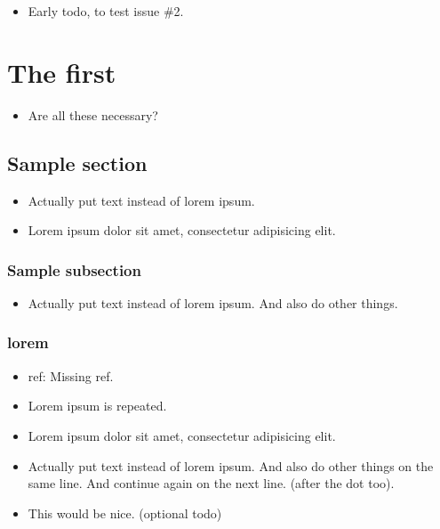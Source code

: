     \begin{itemize}[noitemsep]
        \item {\color{red}Early todo, to test issue \#2.}
    \end{itemize}
\chapter{The first}
\label{autosec:0}
    \begin{itemize}[noitemsep]
        \item {\color{ForestGreen}Are all these necessary?}
    \end{itemize}
\section{Sample section}
\label{autosec:1}
    \begin{itemize}[noitemsep]
        \item {\color{red}Actually put text instead of lorem ipsum.}
        \item Lorem ipsum dolor sit amet, consectetur adipisicing elit.
    \end{itemize}
\subsection{Sample subsection}
\label{autosec:2}
    \begin{itemize}[noitemsep]
        \item {\color{red}Actually put text instead of lorem ipsum.}
{\color{red}And also do other things.}
    \end{itemize}
\subsection{lorem}
\label{autosec:3}
    \begin{itemize}[noitemsep]
        \item {\color{Periwinkle}ref: Missing ref.}
        \item {\color{DarkOrchid}Lorem ipsum is repeated.}
        \item Lorem ipsum dolor sit amet, consectetur adipisicing elit.
        \item {\color{red}Actually put text instead of lorem ipsum. And also do other things on the same line.}
{\color{red}And continue again on the next line. (after the dot too).}
        \item {\color{Orange}This would be nice. (optional todo)}
    \end{itemize}
